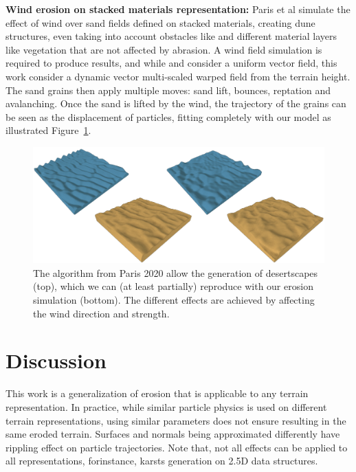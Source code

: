 \textbf{Wind erosion on stacked materials representation: }
Paris et al \cite{Paris2020} simulate the effect of wind over sand fields defined on stacked materials, creating dune structures, even taking into account obstacles like \cite{Roa2004} and different material layers like vegetation \cite{Cordonnier2017a} that are not affected by abrasion\cite{Paris2020}. A wind field simulation is required to produce results, and while \cite{Roa2004} and \cite{Onoue2000} consider a uniform vector field, this work consider a dynamic vector multi-scaled warped field from the terrain height. The sand grains then apply multiple moves: sand lift, bounces, reptation and avalanching. Once the sand is lifted by the wind, the trajectory of the grains can be seen as the displacement of particles, fitting completely with our model as illustrated Figure~\ref{Erosion-fig:screen-paris2020}.
\begin{figure}[ht!]
\centering
\includegraphics{otherPapersRepro/desert.pdf}
\caption{The algorithm from Paris 2020 allow the generation of desertscapes (top), which we can (at least partially) reproduce with our erosion simulation (bottom). The different effects are achieved by affecting the wind direction and strength. }
\label{Erosion-fig:screen-paris2020}
\end{figure}

\section{Discussion}
This work is a generalization of erosion that is applicable to any terrain representation. In practice, while similar particle physics is used on different terrain representations, using similar parameters does not ensure resulting in the same eroded terrain. Surfaces and normals being approximated differently have rippling effect on particle trajectories. 
Note that, not all effects can be applied to all representations, forinstance, karsts generation on 2.5D data structures. 

